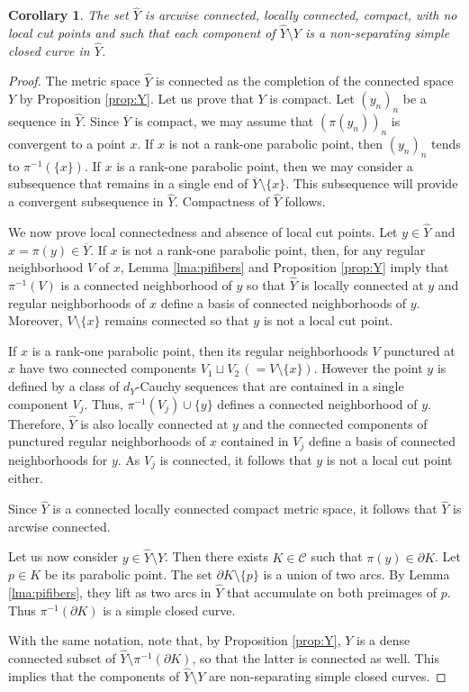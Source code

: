 \documentclass[11pt]{article}
\newtheorem{corollary}[theorem]{Corollary}
\theoremstyle{definition}
\newcommand\CCC{\mathcal{C}}
\renewcommand\hat{\widehat}
\begin{document}
\begin{corollary} \label{cor:tophatY}
The set $\hat{Y}$ is arcwise connected, locally connected, compact, 
with no local cut points 
and such that each component of $\hat{Y}\setminus Y$ is
 a non-separating simple closed curve  in $\hat{Y}$. 
\end{corollary}
\begin{proof} 
The metric space $\hat{Y}$ is connected as the completion of the connected space $Y$ by Proposition \ref{prop:Y}. 
Let us prove that $Y$ is compact. Let $(y_n)_n$ be a sequence in $\hat{Y}$. Since $\overline{Y}$ is compact, we may assume that 
$(\pi(y_n))_n$ is convergent to a point $x$. 
If $x$ is not a rank-one parabolic point, then $(y_n)_n$ tends to $\pi^{-1}(\{x\})$. If $x$
is a rank-one parabolic point, then we may consider a subsequence that remains in a single end of $\overline{Y}\setminus\{x\}$. This subsequence will provide a convergent subsequence in $\hat{Y}$. Compactness of $\hat{Y}$ follows.

We now prove local connectedness and absence of local cut points. Let $y\in \hat{Y}$ and  $x=\pi(y)\in \overline{Y}$. If $x$ is not a rank-one parabolic point, then, for any regular neighborhood $V$ of $x$, Lemma \ref{lma:pifibers} and Proposition \ref{prop:Y} imply that $\pi^{-1}(V)$ is a connected neighborhood of $y$ so that $\hat{Y}$ is locally connected at $y$ and regular neighborhoods of $x$ define a basis of connected neighborhoods of $y$. Moreover, $V\setminus\{x\}$ remains connected so that $y$ is not a local cut point.

If $x$ is a rank-one parabolic point, then its regular neighborhoods $V$ punctured at $x$ have two connected components $V_1\sqcup V_2\,(=V\setminus\{x\})$. 
However the point $y$ is defined by a class of $d_Y$-Cauchy sequences that are contained in a single component $V_j$. 
Thus, $\pi^{-1}(V_j)\cup\{y\}$ defines a connected neighborhood of $y$. 
Therefore, $\hat{Y}$ is also locally connected at $y$  and the connected components of punctured regular neighborhoods of $x$ contained in $V_j$
define a basis of connected neighborhoods for $y$. As $V_j$ is connected, it follows that $y$ is not a local cut point either.

Since $\hat{Y}$ is a connected locally connected compact metric space, it follows that $\hat{Y}$ is arcwise connected.

Let us now consider $y\in\hat{Y}\setminus Y$. Then there exists $K\in\CCC$ such that $\pi(y)\in \partial K$. Let $p\in K$
be its parabolic point. The set $\partial K\setminus \{p\}$ is a union of two arcs. By Lemma \ref{lma:pifibers}, they lift
as two arcs in $\hat{Y}$ that accumulate on both preimages of $p$. Thus $\pi^{-1}(\partial K)$ is a simple closed curve.

With the same notation, note that, by Proposition \ref{prop:Y}, $Y$ is a dense connected subset of $\hat{Y}\setminus \pi^{-1}(\partial K)$, so that the latter is connected as well. This implies that the components of $\hat{Y}\setminus Y$ are non-separating simple closed curves.
\end{proof} 
\end{document}
